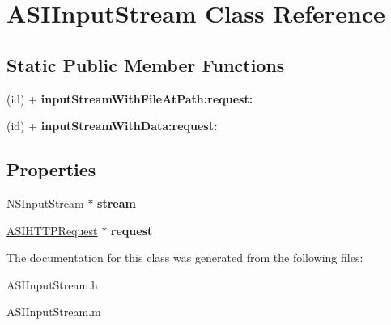 \hypertarget{interface_a_s_i_input_stream}{
\section{ASIInputStream Class Reference}
\label{interface_a_s_i_input_stream}
}
\subsection*{Static Public Member Functions}
\begin{DoxyCompactItemize}
\item 
\hypertarget{interface_a_s_i_input_stream_a1035f560fa6ddef148455388de269472}{
(id) + {\bfseries inputStreamWithFileAtPath:request:}}
\label{interface_a_s_i_input_stream_a1035f560fa6ddef148455388de269472}

\item 
\hypertarget{interface_a_s_i_input_stream_a3c83c62eb777c3bc0920a18f552cc4b9}{
(id) + {\bfseries inputStreamWithData:request:}}
\label{interface_a_s_i_input_stream_a3c83c62eb777c3bc0920a18f552cc4b9}

\end{DoxyCompactItemize}
\subsection*{Properties}
\begin{DoxyCompactItemize}
\item 
\hypertarget{interface_a_s_i_input_stream_ac09491abd1aacf8280b2bee993a6cc6d}{
NSInputStream $\ast$ {\bfseries stream}}
\label{interface_a_s_i_input_stream_ac09491abd1aacf8280b2bee993a6cc6d}

\item 
\hypertarget{interface_a_s_i_input_stream_a1e06728944bae0bdf5cd011c5a1901df}{
\hyperlink{interface_a_s_i_h_t_t_p_request}{ASIHTTPRequest} $\ast$ {\bfseries request}}
\label{interface_a_s_i_input_stream_a1e06728944bae0bdf5cd011c5a1901df}

\end{DoxyCompactItemize}


The documentation for this class was generated from the following files:\begin{DoxyCompactItemize}
\item 
ASIInputStream.h\item 
ASIInputStream.m\end{DoxyCompactItemize}

